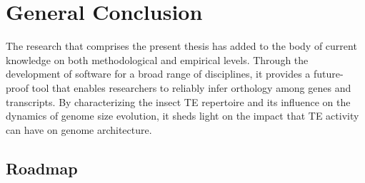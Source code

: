 \chapter{General Conclusion}
\label{conclusion}

The research that comprises the present thesis has added to the body of
current knowledge on both methodological and empirical levels. Through
the development of software for a broad range of disciplines, it
provides a future-proof tool that enables researchers to reliably infer
orthology among genes and transcripts. By characterizing the insect TE
repertoire and its influence on the dynamics of genome size evolution,
it sheds light on the impact that TE activity can have on genome
architecture.

\section{Roadmap}

